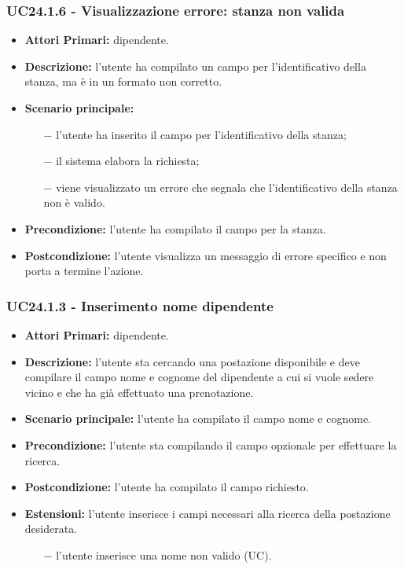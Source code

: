 \subsubsection{ UC24.1.6 - Visualizzazione errore: stanza non valida }
\begin{itemize}
	\item\textbf{Attori Primari:} dipendente.
	\item\textbf{Descrizione:} l’utente ha compilato un campo per l'identificativo della stanza, ma è in un formato non corretto.
	\item\textbf{Scenario principale:} 
	\begin{itemize}
		\item[$-$] l’utente ha inserito il campo per l'identificativo della stanza;
		\item[$-$] il sistema elabora la richiesta;
		\item[$-$] viene visualizzato un errore che segnala che l'identificativo della stanza non è valido.
	\end{itemize}
	\item\textbf{Precondizione:} l’utente ha compilato il campo per la stanza.
	\item\textbf{Postcondizione:} l’utente visualizza un messaggio di errore specifico e non porta a termine l’azione.
\end{itemize}

\subsubsection{ UC24.1.3 - Inserimento nome dipendente }
\begin{itemize}
	\item\textbf{Attori Primari:} dipendente.
	\item\textbf{Descrizione:} l’utente sta cercando una postazione disponibile e deve compilare il campo nome e cognome del dipendente a cui si vuole sedere vicino e che ha già effettuato una prenotazione.
	\item\textbf{Scenario principale:} l’utente ha compilato il campo nome e cognome.
	\item\textbf{Precondizione:} l’utente sta compilando il campo opzionale per effettuare la ricerca.
	\item\textbf{Postcondizione:} l’utente ha compilato il campo richiesto.
	\item\textbf{Estensioni:} l’utente inserisce i campi necessari alla ricerca della postazione desiderata.
	\begin{itemize}
		\item[$-$] l’utente inserisce una nome non valido (UC).
	\end{itemize}
\end{itemize}
